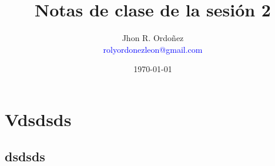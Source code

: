 \documentclass{article}
\title{Notas de clase de la sesión 2}
\author{
        Jhon R. Ordoñez \\
        \textcolor{blue}{rolyordonezleon@gmail.com}
    }
\date{\today}
\begin{document}
        \maketitle
        \thispagestyle{fancy}
    \section{Vdsdsds}
       \subsection{dsdsds}
		
		
		
\end{document}
